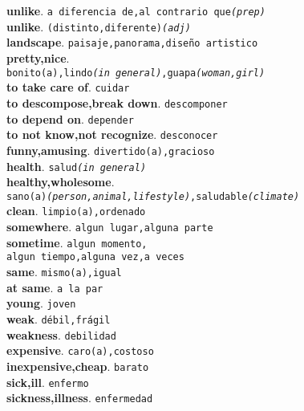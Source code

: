 \documentclass[twocolumn]{article}
\begin{document}
	\textsf{\textbf{unlike}}. \texttt{a diferencia de,al contrario que{\scriptsize \textsl{(prep)}}}\\
	\textsf{\textbf{unlike}}. \texttt{(distinto,diferente){\scriptsize \textsl{(adj)}}}\\
	\textsf{\textbf{landscape}}. \texttt{paisaje,panorama,dise\~no artistico}\\
	\textsf{\textbf{pretty,nice}}.\\\texttt{bonito(a),lindo{\scriptsize \textsl{(in general)}},guapa{\scriptsize \textsl{(woman,girl)}}}\\
	\textsf{\textbf{to take care of}}. \texttt{cuidar}\\
	\textsf{\textbf{to descompose,break down}}. \texttt{descomponer}\\
	\textsf{\textbf{to depend on}}. \texttt{depender}\\
	\textsf{\textbf{to not know,not recognize}}. \texttt{desconocer}\\
	\textsf{\textbf{funny,amusing}}. \texttt{divertido(a),gracioso}\\
	\textsf{\textbf{health}}. \texttt{salud{\scriptsize \textsl{(in general)}}}\\
	\textsf{\textbf{healthy,wholesome}}.\\
			  \texttt{sano(a){\scriptsize \textsl{(person,animal,lifestyle)}},saludable{\scriptsize \textsl{(climate)}}}\\
   \textsf{\textbf{clean}}. \texttt{limpio(a),ordenado}\\
	\textsf{\textbf{somewhere}}. \texttt{algun lugar,alguna parte}\\
	\textsf{\textbf{sometime}}. \texttt{algun momento,\\algun tiempo,alguna vez,a veces}\\
	\textsf{\textbf{same}}. \texttt{mismo(a),igual}\\
	\textsf{\textbf{at same}}. \texttt{a la par}\\
	\textsf{\textbf{young}}. \texttt{joven}\\
	\textsf{\textbf{weak}}. \texttt{d\'ebil,fr\'agil}\\
	\textsf{\textbf{weakness}}. \texttt{debilidad}\\
	\textsf{\textbf{expensive}}. \texttt{caro(a),costoso}\\
	\textsf{\textbf{inexpensive,cheap}}. \texttt{barato}\\
	\textsf{\textbf{sick,ill}}. \texttt{enfermo}\\
	\textsf{\textbf{sickness,illness}}. \texttt{enfermedad}\\
\end{document}
